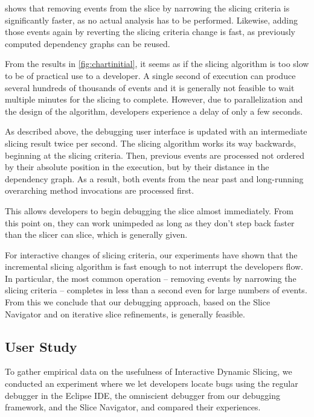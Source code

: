  shows that removing events from the slice by narrowing the slicing criteria is significantly faster, as no actual analysis has to be performed.
Likewise, adding those events again by reverting the slicing criteria change is fast, as previously computed dependency graphs can be reused.

\medskip

From the results in \cref{fig:chartinitial}, it seems as if the slicing algorithm is too slow to be of practical use to a developer.
A single second of execution can produce several hundreds of thousands of events and it is generally not feasible to wait multiple minutes for the slicing to complete.
However, due to parallelization and the design of the algorithm, developers experience a delay of only a few seconds.

As described above, the debugging user interface is updated with an intermediate slicing result twice per second.
The slicing algorithm works its way backwards, beginning at the slicing criteria.
Then, previous events are processed not ordered by their absolute position in the execution, but by their distance in the dependency graph.
As a result, both events from the near past and long-running overarching method invocations are processed first.

This allows developers to begin debugging the slice almost immediately. 
From this point on, they can work unimpeded as long as they don't step back faster than the slicer can slice, which is generally given.

For interactive changes of slicing criteria, our experiments have shown that the incremental slicing algorithm is fast enough to not interrupt the developers flow.
In particular, the most common operation -- removing events by narrowing the slicing criteria -- completes in less than a second even for large numbers of events.
From this we conclude that our debugging approach, based on the Slice Navigator and on iterative slice refinements, is generally feasible.


\subsection{User Study}

To gather empirical data on the usefulness of Interactive Dynamic Slicing, we conducted an experiment where we let developers locate bugs using the regular debugger in the Eclipse IDE, the omniscient debugger from our debugging framework, and the Slice Navigator, and compared their experiences.

